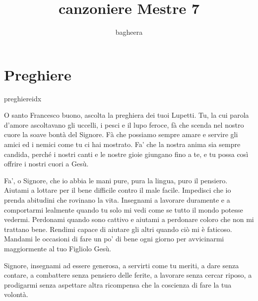 \documentclass[a4paper,12pt, twoside]{article}
\begin{document}
\title{\textbf{canzoniere Mestre 7}}
\author{bagheera}
\newpage





\section*{Preghiere}
\newpage

\begin{songs}{preghiereidx}

\beginverse
O santo Francesco buono,
ascolta la preghiera dei tuoi Lupetti.
Tu, la cui parola d’amore ascoltavano
gli uccelli, i pesci e il lupo feroce,
fà che scenda nel nostro cuore
la soave bontà del Signore.
Fà che possiamo sempre
amare e servire gli amici
ed i nemici come tu ci hai mostrato.
Fa' che la nostra anima sia sempre candida,
perché i nostri canti e le nostre gioie
giungano fino a te, e tu possa così
offrire i nostri cuori a Gesù.

\endverse
\endsong

\begin{intersong}
\bigskip
\end{intersong}

\beginverse
Fa’, o Signore, che io abbia le mani pure,
pura la lingua, puro il pensiero.
Aiutami a lottare per il bene difficile
contro il male facile.
Impedisci che io prenda abitudini
che rovinano la vita.
Insegnami a lavorare duramente
e a comportarmi lealmente
quando tu solo mi vedi
come se tutto il mondo potesse vedermi.
Perdonami quando sono cattivo
e aiutami a perdonare coloro che non mi trattano bene.
Rendimi capace di aiutare gli altri
quando ciò mi è faticoso.
Mandami le occasioni di fare un po’ di bene ogni giorno
per avvicinarmi maggiormente al tuo Figliolo Gesù.

\endverse
\endsong


\beginverse
Signore,
insegnami ad essere generosa,
a servirti come tu meriti,
a dare senza contare,
a combattere senza pensiero delle ferite,
a lavorare senza cercar riposo,
a prodigarmi
senza aspettare altra ricompensa
che la coscienza di fare la tua volontà.



\end{songs}
\end{document}
